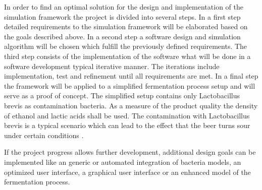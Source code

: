 In order to find an optimal solution for the design and implementation of the simulation framework the project is divided into several steps.
In a first step detailed requirements to the simulation framework will be elaborated based on the goals described above. In a second step
a software design and simulation algorithm will be chosen which fulfill the previously defined requirements. The third step consists of the
implementation of the software what will be done in a software development typical iterative manner. The iterations include implementation,
test and refinement until all requirements are met. In a final step the framework will be applied to a simplified fermentation process setup
and will serve as a proof of concept. The simplified setup contains only Lactobacillus brevis as contamination bacteria. As a measure of
the product quality the density of ethanol and lactic acids shall be used. The contamination with Lactobacillus brevis is a typical
scenario which can lead to the effect that the beer turns sour under certain conditions \cite{JIB:JIB49}.

If the project progress allows further development, additional design goals can be implemented like an generic or automated integration of
bacteria models, an optimized user interface, a graphical user interface or an enhanced model of the fermentation process.

